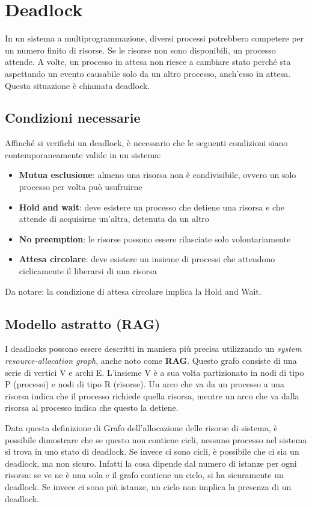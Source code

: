 \documentclass[a4paper]{article}
\begin{document}
\newpage
\section{Deadlock}
In un sistema a multiprogrammazione, diversi processi potrebbero competere per un numero finito di risorse. Se le risorse non sono disponibili, un processo attende. A volte, un processo in attesa non riesce a cambiare stato perché sta aspettando un evento causabile solo da un altro processo, anch'esso in attesa. Questa situazione è chiamata deadlock.

\subsection{Condizioni necessarie}

Affinché si verifichi un deadlock, è necessario che le seguenti condizioni siano contemporaneamente valide in un sistema:
\begin{itemize}
   \item \textbf{Mutua esclusione}: almeno una risorsa non è condivisibile, ovvero un solo processo per volta può usufruirne
   \item \textbf{Hold and wait}: deve esistere un processo che detiene una risorsa e che attende di acquisirne un'altra, detenuta da un altro
   \item \textbf{No preemption}: le risorse possono essere rilasciate solo volontariamente
   \item \textbf{Attesa circolare}: deve esistere un insieme di processi che attendono ciclicamente il liberarsi di una risorsa
\end{itemize}
Da notare: la condizione di attesa circolare implica la Hold and Wait.

\subsection{Modello astratto (RAG)}
I deadlocks possono essere descritti in maniera più precisa utilizzando un \textit{system resource-allocation graph}, anche noto come \textbf{RAG}. Questo grafo consiste di una serie di vertici V e archi E. L'insieme V è a sua volta partizionato in nodi di tipo P (processi) e nodi di tipo R (risorse). Un arco che va da un processo a una risorsa indica che il processo richiede quella risorsa, mentre un arco che va dalla risorsa al processo indica che questo la detiene.

Data questa definizione di Grafo dell'allocazione delle risorse di sistema, è possibile dimostrare che se questo non contiene cicli, nessuno processo nel sistema si trova in uno stato di deadlock. Se invece ci sono cicli, è possibile che ci sia un deadlock, ma non sicuro. Infatti la cosa dipende dal numero di istanze per ogni risorsa: se ve ne è una sola e il grafo contiene un ciclo, si ha sicuramente un deadlock. Se invece ci sono più istanze, un ciclo non implica la presenza di un deadlock.
\end{document}
